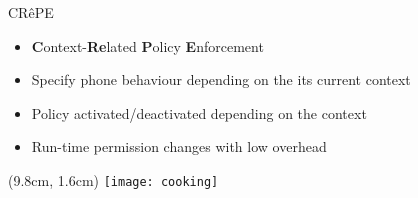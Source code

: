 \begin{frame}{CR\^ePE}

\fontsize{15pt}{0}\selectfont

\vspace*{0.2cm}

\begin{itemize}
  \item \textbf{C}ontext-\textbf{Re}lated \textbf{P}olicy \textbf{E}nforcement

  \vfill

  \item Specify phone behaviour depending on the its current context

  \vfill

  \item Policy activated/deactivated depending on the context

  \vfill 

  \item Run-time permission changes with low overhead
\end{itemize}

\begin{textblock*}{1cm}(9.8cm, 1.6cm)
    \texttt{[image: cooking]}
\end{textblock*}

\end{frame}